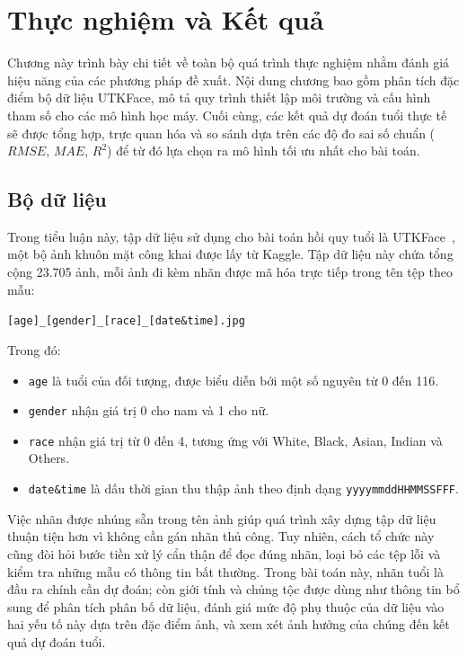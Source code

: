\chapter{Thực nghiệm và Kết quả}

Chương này trình bày chi tiết về toàn bộ quá trình thực nghiệm nhằm đánh giá hiệu năng của các phương pháp đề xuất. Nội dung chương bao gồm phân tích đặc điểm bộ dữ liệu UTKFace, mô tả quy trình thiết lập môi trường và cấu hình tham số cho các mô hình học máy. Cuối cùng, các kết quả dự đoán tuổi thực tế sẽ được tổng hợp, trực quan hóa và so sánh dựa trên các độ đo sai số chuẩn ($RMSE$, $MAE$, $R^2$) để từ đó lựa chọn ra mô hình tối ưu nhất cho bài toán.

\section{Bộ dữ liệu}
Trong tiểu luận này, tập dữ liệu sử dụng cho bài toán hồi quy tuổi là UTKFace~\cite{zhang2017cvpr,UTKFaceKaggle}, một bộ ảnh khuôn mặt công khai được lấy từ Kaggle. Tập dữ liệu này chứa tổng cộng 23.705 ảnh, mỗi ảnh đi kèm nhãn được mã hóa trực tiếp trong tên tệp theo mẫu:

\begin{center}
\texttt{[age]\_[gender]\_[race]\_[date\&time].jpg}
\end{center}

Trong đó:
\begin{itemize}
	\item \texttt{age} là tuổi của đối tượng, được biểu diễn bởi một số nguyên từ 0 đến 116.
	\item \texttt{gender} nhận giá trị 0 cho nam và 1 cho nữ.
	\item \texttt{race} nhận giá trị từ 0 đến 4, tương ứng với White, Black, Asian, Indian và Others.
	\item \texttt{date\&time} là dấu thời gian thu thập ảnh theo định dạng \texttt{yyyymmddHHMMSSFFF}.
\end{itemize}

Việc nhãn được nhúng sẵn trong tên ảnh giúp quá trình xây dựng tập dữ liệu thuận tiện hơn vì không cần gán nhãn thủ công. Tuy nhiên, cách tổ chức này cũng đòi hỏi bước tiền xử lý cẩn thận để đọc đúng nhãn, loại bỏ các tệp lỗi và kiểm tra những mẫu có thông tin bất thường. Trong bài toán này, nhãn tuổi là đầu ra chính cần dự đoán; còn giới tính và chủng tộc được dùng như thông tin bổ sung để phân tích phân bố dữ liệu, đánh giá mức độ phụ thuộc của dữ liệu vào hai yếu tố này dựa trên đặc điểm ảnh, và xem xét ảnh hưởng của chúng đến kết quả dự đoán tuổi.

